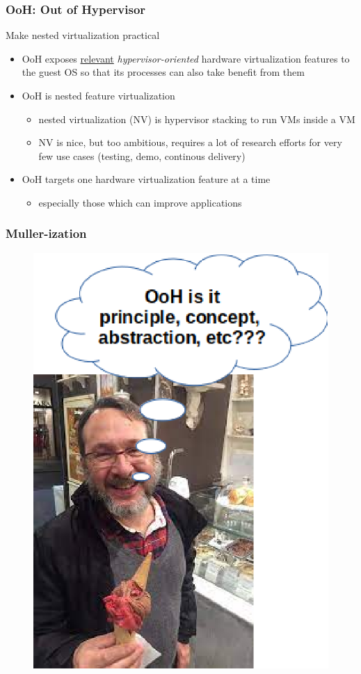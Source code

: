 \documentclass[xcolor=table,bigger,unknownkeysallowed]{beamer}
\begin{document}
        \begin{frame}
        \frametitle{OoH: Out of Hypervisor} 
			\begin{block}{Make nested virtualization practical}
				\begin{itemize}
					\item OoH exposes \underline{relevant} \textit{hypervisor-oriented} hardware virtualization features to the guest OS so that its processes can also take benefit from them
					\item OoH is nested feature virtualization
					\begin{itemize}
						\item nested virtualization (NV) is hypervisor stacking to run VMs inside a VM
						\item NV is nice, but too ambitious, requires a lot of research efforts for very few use cases (testing, demo, continous delivery)
					\end{itemize}
					\item OoH targets one hardware virtualization feature at a time
					\begin{itemize}
						\item especially those which can improve applications
					\end{itemize}
				\end{itemize}
			\end{block}			
        \end{frame}
        \begin{frame}
        \frametitle{Muller-ization} 
 		    \begin{figure}
			\centering
	\includegraphics[width=.3\columnwidth]{fig/mullerization}
			\end{figure}         
        \end{frame} 
\end{document}
